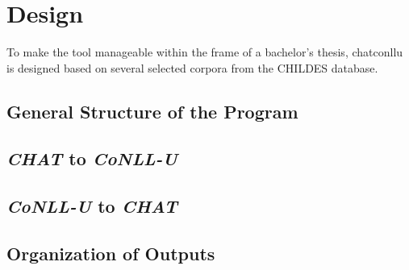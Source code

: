 \chapter{Design} %

\label{Chapter3} %

To make the tool manageable within the frame of a bachelor's thesis, chatconllu is designed based on several selected corpora from the CHILDES database.

\section{General Structure of the Program}
\section{\emph{CHAT} to \emph{CoNLL-U}}
\section{\emph{CoNLL-U} to \emph{CHAT}}
\section{Organization of Outputs}
